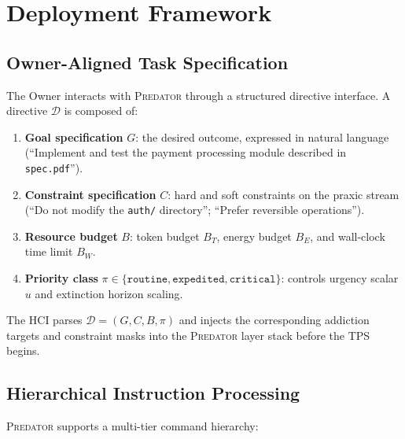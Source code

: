 \documentclass[12pt,a4paper]{article}
\newcommand{\PREDATOR}{\textsc{Predator}}
\begin{document}
\section{Deployment Framework}
\label{sec:deployment}

\subsection{Owner-Aligned Task Specification}

The Owner interacts with \PREDATOR{} through a structured directive interface.
A directive $\mathcal{D}$ is composed of:

\begin{enumerate}
  \item \textbf{Goal specification} $G$: the desired outcome, expressed in
    natural language (``Implement and test the payment processing module
    described in \texttt{spec.pdf}'').
  \item \textbf{Constraint specification} $C$: hard and soft constraints on
    the praxic stream (``Do not modify the \texttt{auth/} directory'';
    ``Prefer reversible operations'').
  \item \textbf{Resource budget} $B$: token budget $B_T$, energy budget $B_E$,
    and wall-clock time limit $B_W$.
  \item \textbf{Priority class} $\pi \in \{\texttt{routine},
    \texttt{expedited}, \texttt{critical}\}$: controls urgency scalar $u$
    and extinction horizon scaling.
\end{enumerate}

The HCI parses $\mathcal{D} = (G, C, B, \pi)$ and injects the corresponding
addiction targets and constraint masks into the \PREDATOR{} layer stack before
the TPS begins.

\subsection{Hierarchical Instruction Processing}

\PREDATOR{} supports a multi-tier command hierarchy:

\begin{center}
\end{center}
\end{document}
